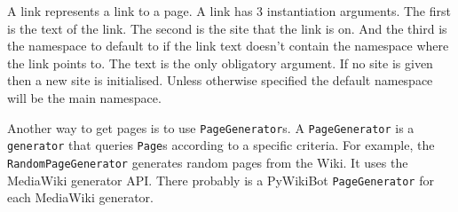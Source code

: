A link represents a link to a page. A link has 3 instantiation arguments. The
first is the text of the link. The second is the site that the link is on. And
the third is the namespace to default to if the link text doesn't contain the
namespace where the link points to. The text is the only obligatory argument. If
no site is given then a new site is initialised. Unless otherwise specified the
default namespace will be the main namespace.

Another way to get pages is to use \verb;PageGenerator;s. A \verb;PageGenerator;
is a \verb;generator; that queries \verb;Page;s according to a specific
criteria. For example, the \verb;RandomPageGenerator; generates random pages
from the Wiki. It uses the MediaWiki generator API. There probably is a
PyWikiBot \verb;PageGenerator; for each MediaWiki generator.
